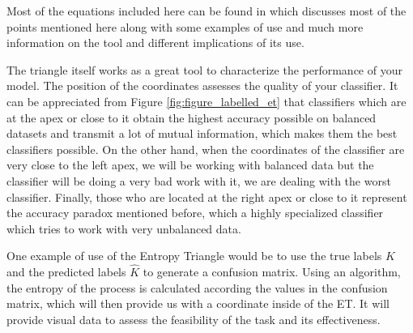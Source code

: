 Most of the equations included here can be found in \cite{val:pel:18c} which discusses most of the points mentioned here along with some examples of use and much more information on the tool and different implications of its use. \par

The triangle itself works as a great tool to characterize the performance of your model. The position of the coordinates assesses the quality of your classifier. It can be appreciated from Figure \ref{fig:figure_labelled_et} that classifiers which are at the apex or close to it obtain the highest accuracy possible on balanced datasets and transmit a lot of mutual information, which makes them the best classifiers possible. On the other hand, when the coordinates of the classifier are very close to the left apex, we will be working with balanced data but the classifier will be doing a very bad work with it, we are dealing with the worst classifier. Finally, those who are located at the right apex or close to it represent the accuracy paradox mentioned before, which a highly specialized classifier which tries to work with very unbalanced data.\par

One example of use of the Entropy Triangle would be to use the true labels $K$ and the predicted labels $\hat{K}$ to generate a confusion matrix. Using an algorithm, the entropy of the process is calculated according the values in the confusion matrix, which will then provide us with a coordinate inside of the ET. It will provide visual data to assess the feasibility of the task and its effectiveness.\par





